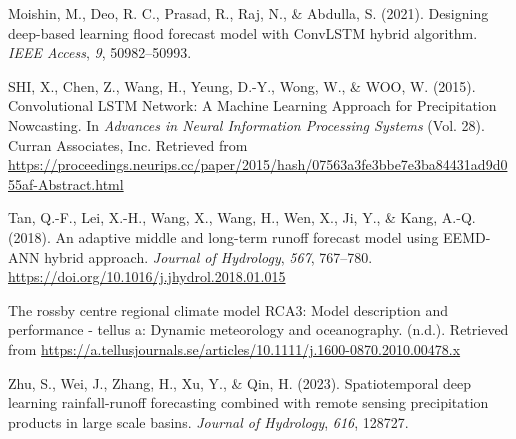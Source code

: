 \documentclass[
]{agujournal2019}
\newlength{\cslhangindent}
\newenvironment{CSLReferences}[2] %
 {\begin{list}{}{%
  \setlength{\itemindent}{0pt}
  \setlength{\leftmargin}{0pt}
  \setlength{\parsep}{0pt}
  \ifodd #1
   \setlength{\leftmargin}{\cslhangindent}
   \setlength{\itemindent}{-1\cslhangindent}
  \fi
  \setlength{\itemsep}{#2\baselineskip}}}
 {\end{list}}
\begin{document}
\begin{CSLReferences}{1}{0}
Moishin, M., Deo, R. C., Prasad, R., Raj, N., \& Abdulla, S. (2021).
Designing deep-based learning flood forecast model with ConvLSTM hybrid
algorithm. \emph{IEEE Access}, \emph{9}, 50982--50993.

SHI, X., Chen, Z., Wang, H., Yeung, D.-Y., Wong, W., \& WOO, W. (2015).
Convolutional {LSTM Network}: {A Machine Learning Approach} for
{Precipitation Nowcasting}. In \emph{Advances in {Neural Information
Processing Systems}} (Vol. 28). Curran Associates, Inc. Retrieved from
\url{https://proceedings.neurips.cc/paper/2015/hash/07563a3fe3bbe7e3ba84431ad9d055af-Abstract.html}

Tan, Q.-F., Lei, X.-H., Wang, X., Wang, H., Wen, X., Ji, Y., \& Kang,
A.-Q. (2018). An adaptive middle and long-term runoff forecast model
using {EEMD-ANN} hybrid approach. \emph{Journal of Hydrology},
\emph{567}, 767--780.
\url{https://doi.org/10.1016/j.jhydrol.2018.01.015}

The rossby centre regional climate model RCA3: Model description and
performance - tellus a: Dynamic meteorology and oceanography. (n.d.).
Retrieved from
\url{https://a.tellusjournals.se/articles/10.1111/j.1600-0870.2010.00478.x}

Zhu, S., Wei, J., Zhang, H., Xu, Y., \& Qin, H. (2023). Spatiotemporal
deep learning rainfall-runoff forecasting combined with remote sensing
precipitation products in large scale basins. \emph{Journal of
Hydrology}, \emph{616}, 128727.

\end{CSLReferences}
\end{document}
